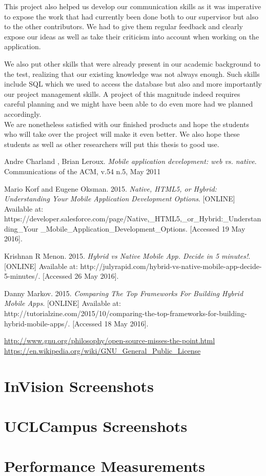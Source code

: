 \documentclass{eplmastersthesis}
\begin{document}
This project also helped us develop our communication skills as it was imperative to expose the work that had currently been done both to our supervisor but also to the other contributors. We had to give them regular feedback and clearly expose our ideas as well as take their criticism into account when working on the application.\\

\newpage

We also put other skills that were already present in our academic background to the test, realizing that our existing knowledge was not always enough. Such skills include SQL which we used to access the database but also and more importantly our project management skills. A project of this magnitude indeed requires careful planning and we might have been able to do even more had we planned accordingly.\\

We are nonetheless satisfied with our finished products and hope the students who will take over the project will make it even better. We also hope these students as well as other researchers will put this thesis to good use.\\
\begin{thebibliography}{9}

\bibitem{} 
Andre Charland , Brian Leroux.
\textit{Mobile application development: web vs. native}. 
Communications of the ACM, v.54 n.5, May 2011  

\bibitem{} 
Mario Korf and Eugene Oksman. 2015.
\textit{Native, HTML5, or Hybrid: Understanding Your Mobile Application Development Options}.
[ONLINE] Available at: https://developer.salesforce.com/page/Native,\_HTML5,\_or\_Hybrid:\_Understanding\_Your
\_Mobile\_Application\_Development\_Options. [Accessed 19 May 2016].


\bibitem{} 
Krishnan R Menon. 2015.
\textit{Hybrid vs Native Mobile App. Decide in 5 minutes!}.
[ONLINE] Available at: http://julyrapid.com/hybrid-vs-native-mobile-app-decide-5-minutes/. [Accessed 26 May 2016].
 
\bibitem{} 
Danny Markov. 2015.
\textit{Comparing The Top Frameworks For Building Hybrid Mobile Apps}.
[ONLINE] Available at: http://tutorialzine.com/2015/10/comparing-the-top-frameworks-for-building-hybrid-mobile-apps/. [Accessed 18 May 2016].

\end{thebibliography}
\url{http://www.gnu.org/philosophy/open-source-misses-the-point.html}\\
\url{https://en.wikipedia.org/wiki/GNU_General_Public_License}\\
\newpage

\appendix
\chapter{InVision Screenshots}
\chapter{UCLCampus Screenshots}
\chapter{Performance Measurements}



\backcoverpage
\end{document}
